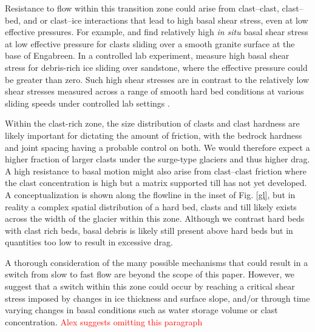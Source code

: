 \documentclass[draft,linenumbers]{agujournal}
\begin{document}
Resistance to flow within this transition zone could arise from clast--clast, clast--bed, and or clast--ice interactions that lead to high basal shear stress, even at low effective pressures. For example, \cite{Iverson2003} and \cite{Cohen2005} find relatively high \emph{in situ} basal shear stress at low effective pressure for clasts sliding over a smooth granite surface at the base of Engabreen. In a controlled lab experiment, \cite{Zoet2013} measure high basal shear stress for debris-rich ice sliding over sandstone, where the effective pressure could be greater than zero. Such high shear stresses are in contrast to the relatively low shear stresses measured across a range of smooth hard bed conditions at various sliding speeds under controlled lab settings \citep[e.g.][]{Budd1979,Zoet2015,Zoet2016}. 

Within the clast-rich zone, the size distribution of clasts \citep[e.g.][]{Cohen2005} and clast hardness are likely important for dictating the amount of friction, with the bedrock hardness and joint spacing having a probable control on both. We would therefore expect a higher fraction of larger clasts under the surge-type glaciers and thus higher drag. A high resistance to basal motion might also arise from clast--clast friction where the clast concentration is high but a matrix supported till has not yet developed. A conceptualization is shown along the flowline in the inset of Fig. \ref{gl}, but in reality a complex spatial distribution of a hard bed, clasts and till likely exists across the width of the glacier within this zone. Although we contrast hard beds with clast rich beds, basal debris is likely still present above hard beds but in quantities too low to result in excessive drag. 

A thorough consideration of the many possible mechanisms that could result in a switch from slow to fast flow are beyond the scope of this paper. However, we suggest that a switch within this zone could occur by reaching a critical shear stress imposed by changes in ice thickness and surface slope, and/or through time varying changes in basal conditions such as water storage volume or clast concentration. \textcolor{red}{Alex suggests omitting this paragraph}
\end{document}

